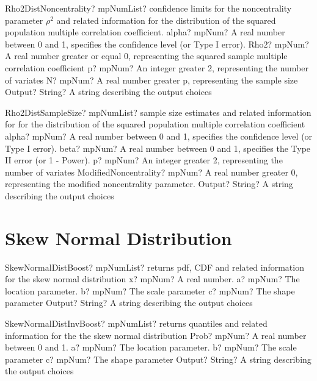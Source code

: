 \documentclass[12pt,a4paper,openany]{book}
\begin{document}
\begin{mpFunctionsExtract}
\mpFunctionFiveNotImplemented
{Rho2DistNoncentrality? mpNumList? confidence limits for the noncentrality parameter $\rho^2$ and related information for the distribution of the squared population multiple correlation coefficient.}
{alpha? mpNum? A real number between 0 and 1, specifies the confidence level (or Type I error).}
{Rho2? mpNum? A real number greater or equal 0, representing the squared sample multiple correlation coefficient}
{p? mpNum? An integer greater 2, representing the number of variates}
{N? mpNum? A real number greater p, representing the sample size}
{Output? String? A string describing the output choices}
\end{mpFunctionsExtract}

\begin{mpFunctionsExtract}
\mpFunctionFiveNotImplemented
{Rho2DistSampleSize? mpNumList? sample size estimates and related information for for the distribution of the squared population multiple correlation coefficient}
{alpha? mpNum? A real number between 0 and 1, specifies the confidence level (or Type I error).}
{beta? mpNum?  A real number between 0 and 1, specifies the Type II error (or 1 - Power).}
{p? mpNum? An integer greater 2, representing the number of variates}
{ModifiedNoncentrality? mpNum? A real number greater 0, representing the modified noncentrality parameter.}
{Output? String? A string describing the output choices}
\end{mpFunctionsExtract}

\section{Skew Normal Distribution}

\begin{mpFunctionsExtract}
\mpFunctionFiveNotImplemented
{SkewNormalDistBoost? mpNumList? returns pdf, CDF and related information for the skew normal distribution}
{x? mpNum? A real number.}
{a? mpNum? The location parameter.}
{b? mpNum? The scale parameter}
{c? mpNum? The shape parameter}
{Output? String? A string describing the output choices}
\end{mpFunctionsExtract}

\begin{mpFunctionsExtract}
\mpFunctionFiveNotImplemented
{SkewNormalDistInvBoost? mpNumList? returns quantiles and related information for the the skew normal distribution}
{Prob? mpNum? A real number between 0 and 1.}
{a? mpNum? The location parameter.}
{b? mpNum? The scale parameter}
{c? mpNum? The shape parameter}
{Output? String? A string describing the output choices}
\end{mpFunctionsExtract}
\end{document}
